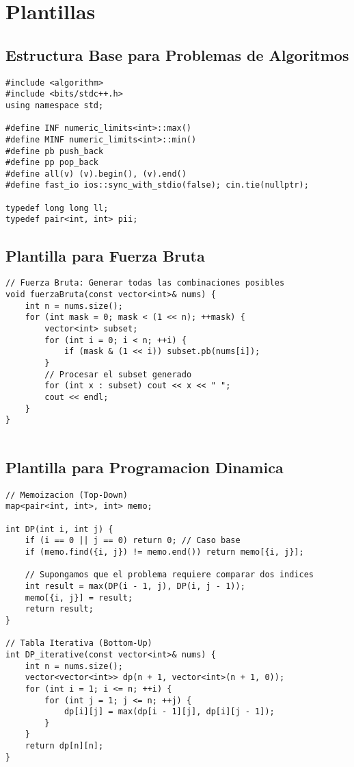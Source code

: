 \section{Plantillas}
\subsection{Estructura Base para Problemas de Algoritmos}

\begin{lstlisting}[style=cpp]
#include <algorithm>
#include <bits/stdc++.h>
using namespace std;

#define INF numeric_limits<int>::max()
#define MINF numeric_limits<int>::min()
#define pb push_back
#define pp pop_back
#define all(v) (v).begin(), (v).end()
#define fast_io ios::sync_with_stdio(false); cin.tie(nullptr);

typedef long long ll;
typedef pair<int, int> pii;

\end{lstlisting}


\subsection{Plantilla para Fuerza Bruta}

\begin{lstlisting}[style=cpp]
// Fuerza Bruta: Generar todas las combinaciones posibles
void fuerzaBruta(const vector<int>& nums) {
    int n = nums.size();
    for (int mask = 0; mask < (1 << n); ++mask) {
        vector<int> subset;
        for (int i = 0; i < n; ++i) {
            if (mask & (1 << i)) subset.pb(nums[i]);
        }
        // Procesar el subset generado
        for (int x : subset) cout << x << " ";
        cout << endl;
    }
}


\end{lstlisting}

\subsection{Plantilla para Programacion Dinamica}

\begin{lstlisting}[style=cpp]
// Memoizacion (Top-Down)
map<pair<int, int>, int> memo;

int DP(int i, int j) {
    if (i == 0 || j == 0) return 0; // Caso base
    if (memo.find({i, j}) != memo.end()) return memo[{i, j}];
    
    // Supongamos que el problema requiere comparar dos indices
    int result = max(DP(i - 1, j), DP(i, j - 1));
    memo[{i, j}] = result;
    return result;
}

// Tabla Iterativa (Bottom-Up)
int DP_iterative(const vector<int>& nums) {
    int n = nums.size();
    vector<vector<int>> dp(n + 1, vector<int>(n + 1, 0));
    for (int i = 1; i <= n; ++i) {
        for (int j = 1; j <= n; ++j) {
            dp[i][j] = max(dp[i - 1][j], dp[i][j - 1]);
        }
    }
    return dp[n][n];
}


\end{lstlisting}

